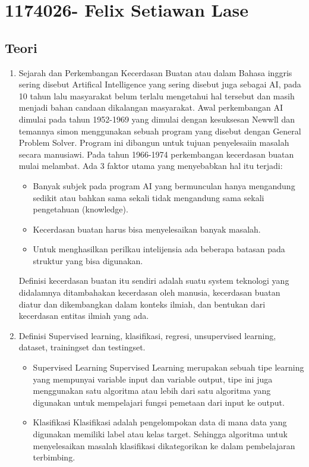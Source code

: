 \section{1174026- Felix Setiawan Lase}
\subsection{Teori}
\begin{enumerate}
	\item Sejarah dan Perkembangan
	\hfill\break
	Kecerdasan Buatan atau dalam Bahasa inggris sering disebut Artifical Intelligence yang sering disebut juga sebagai AI, pada 10 tahun lalu masyarakat belum terlalu mengetahui hal tersebut dan masih menjadi bahan candaan dikalangan masyarakat. Awal perkembangan AI dimulai pada tahun 1952-1969 yang dimulai dengan kesuksesan Newwll dan temannya simon menggunakan sebuah program yang disebut dengan General Problem Solver. Program ini dibangun untuk tujuan penyelesaiin masalah secara manusiawi. Pada tahun 1966-1974 perkembangan kecerdasan buatan mulai melambat. Ada 3 faktor utama yang menyebabkan hal itu terjadi:
	\begin{itemize}
		\item Banyak subjek pada program AI yang bermunculan hanya mengandung sedikit atau bahkan sama sekali tidak  mengandung sama sekali pengetahuan (knowledge).
		\item Kecerdasan buatan harus bisa menyelesaikan banyak masalah.
		\item Untuk menghasilkan perilkau intelijensia ada beberapa batasan pada struktur yang bisa digunakan.
	\end{itemize}
	Definisi kecerdasan buatan itu sendiri adalah suatu system teknologi yang didalamnya ditambahakan kecerdasan oleh manusia, kecerdasan buatan diatur dan dikembangkan dalam konteks ilmiah, dan bentukan dari kecerdasan entitas ilmiah yang ada.
	\item Definisi
	\hfill\break
	Supervised learning, klasifikasi, regresi, unsupervised learning, dataset, trainingset dan testingset.
	\begin{itemize}
		\item Supervised Learning
		\hfill\break
		Supervised Learning merupakan sebuah tipe learning yang mempunyai variable input dan variable output, tipe ini juga menggunakan satu algoritma atau lebih dari satu algoritma yang digunakan untuk mempelajari fungsi  pemetaan dari input ke output.
		\item Klasifikasi
		\hfill\break
		Klasifikasi adalah pengelompokan data di mana data yang digunakan memiliki label atau kelas target. Sehingga algoritma untuk menyelesaikan masalah klasifikasi dikategorikan ke dalam pembelajaran terbimbing.

\end{itemize}
\end{enumerate}
